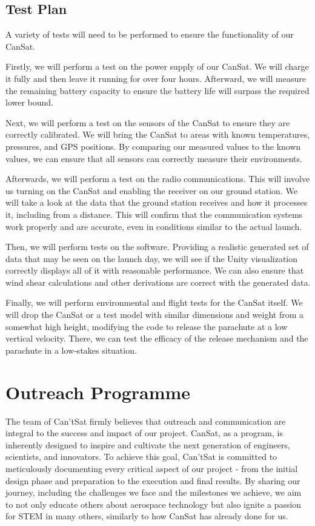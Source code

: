 \documentclass[10pt,twocolumn]{article}
\begin{document}
\subsection{\textbf{Test Plan}}

A variety of tests will need to be performed to ensure the functionality of our CanSat.

Firstly, we will perform a test on the power supply of our CanSat. We will charge it fully and then leave it running for over four hours. Afterward, we will measure the remaining battery capacity to ensure the battery life will surpass the required lower bound.

Next, we will perform a test on the sensors of the CanSat to ensure they are correctly calibrated. We will bring the CanSat to areas with known temperatures, pressures, and GPS positions. By comparing our measured values to the known values, we can ensure that all sensors can correctly measure their environments.

Afterwards, we will perform a test on the radio communications. This will involve us turning on the CanSat and enabling the receiver on our ground station. We will take a look at the data that the ground station receives and how it processes it, including from a distance. This will confirm that the communication systems work properly and are accurate, even in conditions similar to the actual launch.

Then, we will perform tests on the software. Providing a realistic generated set of data that may be seen on the launch day, we will see if the Unity visualization correctly displays all of it with reasonable performance. We can also ensure that wind shear calculations and other derivations are correct with the generated data.

Finally, we will perform environmental and flight tests for the CanSat itself. We will drop the CanSat or a test model with similar dimensions and weight from a somewhat high height, modifying the code to release the parachute at a low vertical velocity. There, we can test the efficacy of the release mechanism and the parachute in a low-stakes situation.

\section{\textbf{Outreach Programme}}

The team of Can’tSat firmly believes that outreach and communication are integral to the success and impact of our project. CanSat, as a program, is inherently designed to inspire and cultivate the next generation of engineers, scientists, and innovators. To achieve this goal, Can’tSat is committed to meticulously documenting every critical aspect of our project - from the initial design phase and preparation to the execution and final results. By sharing our journey, including the challenges we face and the milestones we achieve, we aim to not only educate others about aerospace technology but also ignite a passion for STEM in many others, similarly to how CanSat has already done for us.
\end{document}
